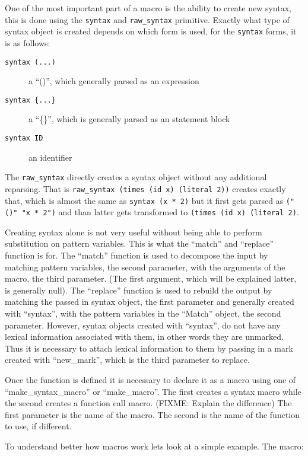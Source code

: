 \documentclass[12pt,english,letterpaper]{article}
\begin{document}
One of the most important part of a macro is the ability to create new
syntax, this is done using the \verb/syntax/ and \verb/raw_syntax/
primitive.  Exactly what type of syntax object is created depends on
which form is used, for the \verb/syntax/ forms, it is as follows:
\begin{description}
\item[\texttt{syntax (...)}] a ``()'', which generally parsed as an expression
\item[\texttt{syntax \{...\}}] a ``\{\}'', which is generally parsed as an statement block
\item[\texttt{syntax ID}] an identifier
\end{description}
The \verb/raw_syntax/ directly creates a syntax object without any
additional reparsing.  That is
\verb/raw_syntax (times (id x) (literal 2))/ creates exactly that,
which is almost the same as \verb/syntax (x * 2)/ but it first gets
parsed as \verb/("()" "x * 2")/ and than latter gets transformed to
\verb/(times (id x) (literal 2)/.

Creating syntax alone is not very useful without being able to perform
substitution on pattern variables.  This is what the ``match'' and
``replace'' function is for.  The ``match'' function is used to
decompose the input by matching pattern variables, the second
parameter, with the arguments of the macro, the third
parameter.  (The first argument, which will be explained latter, is
generally null).  The ``replace'' function is used to rebuild the
output by matching the passed in syntax object, the first parameter
and generally created with ``syntax'', with the pattern variables
in the ``Match'' object, the second parameter.  However, syntax
objects created with ``syntax'', do not have any lexical information
associated with them, in other words they are unmarked.  Thus it is
necessary to attach lexical information to them by passing in a mark
created with ``new\_mark'', which is the third parameter to replace.

Once the function is defined it is necessary to declare it as a macro
using one of ``make\_syntax\_macro'' or ``make\_macro''.  The first creates a
syntax macro while the second creates a function call macro. (FIXME:
Explain the difference) The first parameter is the name of the macro.
The second is the name of the function to use, if different.


To understand better how macros work lets look at a simple example.
The macro:
\end{document}
